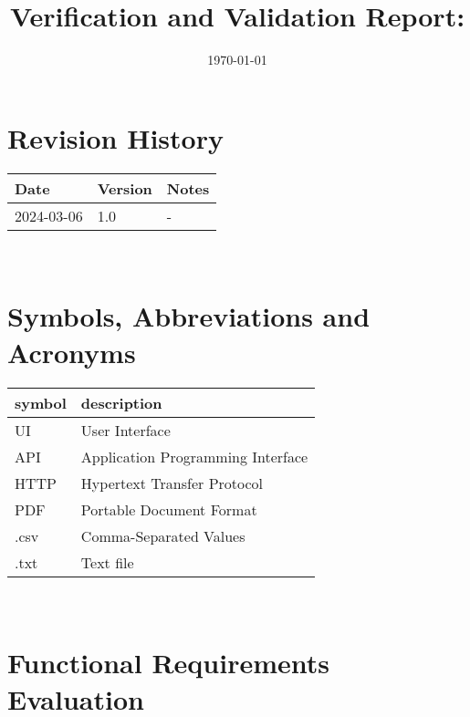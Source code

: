 \documentclass[12pt, titlepage]{article}
\begin{document}
\title{Verification and Validation Report: \progname} 
\author{\authname}
\date{\today}
	
\maketitle


\section{Revision History}

\begin{tabularx}{\textwidth}{p{3cm}p{2cm}X}
\toprule {\bf Date} & {\bf Version} & {\bf Notes}\\
\midrule
2024-03-06 & 1.0 & -\\
\bottomrule
\end{tabularx}

~\newpage

\section{Symbols, Abbreviations and Acronyms}

\renewcommand{\arraystretch}{1.2}
\begin{tabular}{l l} 
  \toprule		
  \textbf{symbol} & \textbf{description}\\
  \midrule 
      UI & User Interface \\
      API & Application Programming Interface\\
      HTTP & Hypertext Transfer Protocol\\
      PDF & Portable Document Format\\
      .csv & Comma-Separated Values \\
      .txt & Text file\\
  \bottomrule
  
\end{tabular}\\
\newpage

\tableofcontents

\listoftables %

\listoffigures %

\newpage



\section{Functional Requirements Evaluation}
\end{document}
